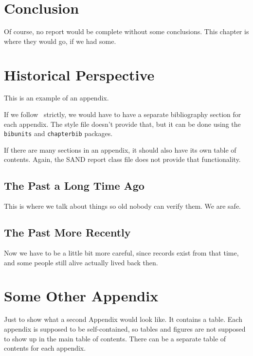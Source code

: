 \documentclass[pdf,ps2pdf,12pt,report,OUO]{SANDreport}
\begin{document}
	


    \chapter{Conclusion}
	Of course, no report would be complete without some conclusions.
	This chapter is where they would go, if we had some.

    \nocite{*}


    \clearpage
    \providecommand*{\phantomsection}{}
    \phantomsection
    
    


    \appendix
    \chapter{Historical Perspective}
	This is an example of an appendix.

	If we follow~\cite{Sand98-0730} strictly, we would have to
	have a separate bibliography section for each appendix.
	The style file doesn't provide that, but it can be done
	using the {\tt bibunits} and {\tt chapterbib} packages.

	If there are many sections in an appendix, it should also
	have its own table of contents. Again, the SAND report class
	file does not provide that functionality.

	\section{The Past a Long Time Ago}
	    This is where we talk about things so old nobody
	    can verify them. We are safe.

	\section{The Past More Recently}
	    Now we have to be a little bit more careful, since
	    records exist from that time, and some people still
	    alive actually lived back then.


    \chapter{Some Other Appendix}
	Just to show what a second Appendix would look like. It contains
	a table. Each appendix is supposed to be self-contained, so
	tables and figures are not supposed to show up in the main
	table of contents. There can be a separate table of contents
	for each appendix.
\end{document}
